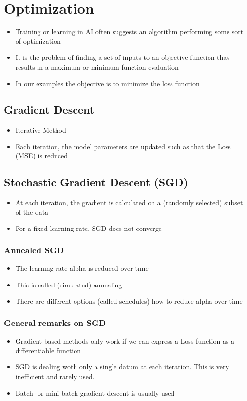 \section{Optimization}
\begin{itemize}
    \item Training or learning in AI often suggests an algorithm performing some sort of optimization
    \item It is the problem of finding a set of inputs to an objective function that results in a maximum or minimum function evaluation
    \item In our examples the objective is to minimize the loss function
\end{itemize}

\subsection{Gradient Descent}
\begin{itemize}
    \item Iterative Method
    \item Each iteration, the model parameters are updated such as that the Loss (MSE) is reduced
\end{itemize}

\subsection{Stochastic Gradient Descent (SGD)}
\begin{itemize}
    \item At each iteration, the gradient is calculated on a (randomly selected) subset of the data
    \item For a fixed learning rate, SGD does not converge
\end{itemize}

\subsubsection{Annealed SGD}
\begin{itemize}
    \item The learning rate alpha is reduced over time
    \item This is called (simulated) annealing
    \item There are different options (called schedules) how to reduce alpha over time
\end{itemize}

\subsubsection{General remarks on SGD}
\begin{itemize}
    \item Gradient-based methods only work if we can express a Loss function as a differentiable function
    \item SGD is dealing woth only a single datum at each iteration. This is very inefficient and rarely used.
    \item Batch- or mini-batch gradient-descent is usually used
\end{itemize}